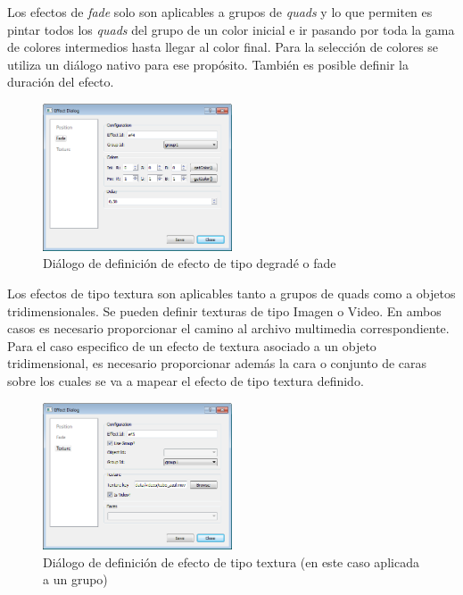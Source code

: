 Los efectos de \emph{fade} solo son aplicables a grupos de \emph{quads} y lo que permiten es pintar todos los \emph{quads} del grupo de un color inicial e ir pasando por toda la gama de colores intermedios hasta llegar al color final. Para la selección de colores se utiliza un diálogo nativo para ese propósito. También es posible definir la duración del efecto.

\begin{figure}[H]
  \centering
    \includegraphics[width=0.5\textwidth]{./Cap5_vmt/vmt_EfectDialog2.png}
  \caption{Diálogo de definición de efecto de tipo degradé o fade}
  \label{fig:VMT-EffectFade}
\end{figure}

Los efectos de tipo textura son aplicables tanto a grupos de quads como a objetos tridimensionales. Se pueden definir texturas de tipo Imagen o Video. En ambos casos es necesario proporcionar el camino al archivo multimedia correspondiente. Para el caso especifico de un efecto de textura asociado a un objeto tridimensional, es necesario proporcionar además la cara o conjunto de caras sobre los cuales se va a mapear el efecto de tipo textura definido.

\begin{figure}[H]
  \centering
    \includegraphics[width=0.5\textwidth]{./Cap5_vmt/vmt_EfectDialog3.png}
  \caption{Diálogo de definición de efecto de tipo textura (en este caso aplicada a un grupo)}
  \label{fig:VMT-EffectTexture}
\end{figure}

